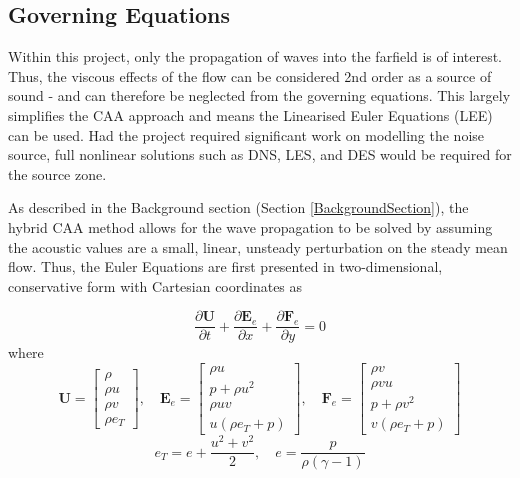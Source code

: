 \subsection{Governing Equations}


Within this project, only the propagation of waves into the farfield is of interest. Thus, the viscous effects of the flow can be considered 2nd order as a source of sound - and can therefore be neglected from the governing equations. This largely simplifies the CAA approach and means the Linearised Euler Equations (LEE) can be used. Had the project required significant work on modelling the noise source, full nonlinear solutions such as DNS, LES, and DES would be required for the source zone.

As described in the Background section (Section \ref{BackgroundSection}), the hybrid CAA method allows for the wave propagation to be solved by assuming the acoustic values are a small, linear, unsteady perturbation on the steady mean flow. Thus, the Euler Equations are first presented in two-dimensional, conservative form with Cartesian coordinates as

\begin{equation}
    \frac{\partial \mathbf{U}}{\partial t} + \frac{\partial \mathbf{E}_{e}}{\partial x} + \frac{\partial \mathbf{F}_{e}}{\partial y} = 0
\end{equation}
where
\begin{displaymath}
\mathbf{U} = 
\begin{bmatrix}
\rho \\
\rho u \\
\rho v \\
\rho e_{T}
\end{bmatrix}, \quad
\mathbf{E}_{e} = 
\begin{bmatrix}
\rho u \\
p + \rho u^2 \\
\rho u v \\
u \left(\rho e_{T} + p \right)
\end{bmatrix}, \quad
\mathbf{F}_{e} = 
\begin{bmatrix}
\rho v \\
\rho v u \\
p + \rho v^2 \\
v \left(\rho e_{T} + p \right)
\end{bmatrix}
\end{displaymath}
\begin{displaymath}
e_T = e + \frac{u^2 + v^2}{2}, \quad e = \frac{p}{\rho \left(\gamma - 1 \right)}
\end{displaymath}




